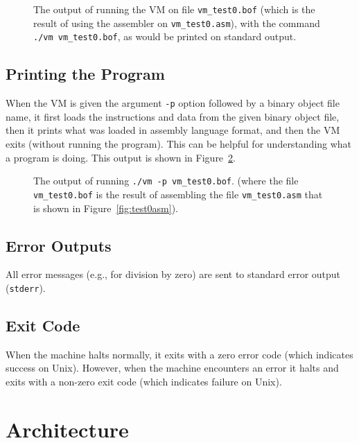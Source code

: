 \documentclass[11pt,letterpaper]{article}
\newcommand{\LSTFILE}[1]{

}
\newcommand{\figref}[1]{Figure~\ref{#1}}  %
\begin{document}
\begin{figure}

\caption{The output of running the VM on file \texttt{vm\_test0.bof}
  (which is the result of using the assembler on \texttt{vm\_test0.asm}),
  with the command \texttt{./vm vm\_test0.bof},
  as would be printed on standard output.} 
\label{fig:test0output}
\end{figure}

\subsection{Printing the Program}
\label{sec:printing}

When the VM is given the argument \texttt{-p} option followed by a
binary object file name, it first loads the instructions and data from the
given binary object file, then it prints what was loaded in assembly
language format, and then the VM exits (without running the program). This
can be helpful for understanding what a program is doing. This output
is shown in \figref{fig:test0listing}.

\begin{figure}
\LSTFILE{vm_test0.lst}
\caption{The output of running \texttt{./vm -p vm\_test0.bof}. 
  (where the file \texttt{vm\_test0.bof} is the result of assembling the file
  \texttt{vm\_test0.asm} that is shown in \figref{fig:test0asm}).} 
\label{fig:test0listing}
\end{figure}

\subsection{Error Outputs}

All error messages (e.g., for division by zero) are sent to
standard error output (\texttt{stderr}).

\subsection{Exit Code}

When the machine halts normally, it exits with a zero error code
(which indicates success on Unix).  However, when the machine
encounters an error it halts and exits with a non-zero exit code
(which indicates failure on Unix).

\section{Architecture}
\end{document}
